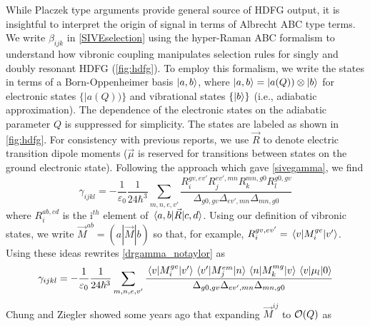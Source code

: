 \documentclass[aip, jcp, reprint, twocolumn]{revtex4-2}
\begin{document}
While Placzek type arguments provide general source of HDFG output, it is insightful to interpret the origin of signal in terms of Albrecht ABC type terms.\cite{Ziegler1988} 
We write $\beta_{ijk}$ in \autoref{SIVEselection} using the hyper-Raman ABC formalism to understand how vibronic coupling manipulates selection rules for singly and doubly resonant HDFG (\autoref{fig:hdfg}). \cite{Ziegler1988, Baranov1990}
To employ this formalism, we write the states in terms of a Born-Oppenheimer basis $\ket{a,b}$, where $\ket{a,b} = |a(Q)) \otimes \ket{b}$ for electronic states $\{|a(Q))\}$ and vibrational states $\{\ket{b}\}$ (i.e., adiabatic approximation). \cite{BornOppenheimer, Tang1970}
The dependence of the electronic states on the adiabatic parameter $Q$ is suppressed for simplicity.
The states are labeled as shown in \autoref{fig:hdfg}.
For consistency with previous reports, we use $\vec{R}$ to denote electric transition dipole moments ($\vec{\mu}$ is reserved for transitions between states on the ground electronic state). \cite{Tang1970}
Following the approach which gave \autoref{sivegamma}, we find
\begin{equation}\label{drgamma_notaylor}
	\gamma_{ijkl} = -\frac{1}{\varepsilon_0} \frac{1}{24 \hbar^3} \sum_{m,n,e,v'} \frac{
		R_{i}^{gv, ev'} 
		R_{j}^{ev',mn} 
		R_{k}^{mn,g0} 
		R_{l}^{g0,gv} 
	}{\Delta_{g0,gv}
		\Delta_{ev', mn}
		\Delta_{mn, g0}
	}
\end{equation}
where $R_{i}^{ab,cd}$ is the i$^{th}$ element of $\mel{a,b}{\vec{R}}{c,d}$.
Using our definition of vibronic states, we write $\vec{M}^{ab} = (a|\vec{M}|b)$ so that, for example,
$R_{i}^{gv,ev'} = \mel{v}{M_i^{ge}}{v'}$.
Using these ideas rewrites \autoref{drgamma_notaylor} as
\begin{equation}\label{drgamma_notaylor_1}
	\begin{split}
		\gamma_{ijkl} &= -\frac{1}{\varepsilon_0} \frac{1}{24 \hbar^3} \sum_{m,n,e,v'} \frac{
			\mel{v}{M_{i}^{ge}}{v'} 
			\mel{v'}{M_{j}^{em}}{n}
			\mel{n}{M_{k}^{mg} }{v}
			\mel{v}{\mu_{l}}{0}
		}{\Delta_{g0,gv}
			\Delta_{ev', mn}
			\Delta_{mn, g0}	} \\
	\end{split}
\end{equation}
Chung and Ziegler showed some years ago that expanding $\vec{M}^{ij}$ to $\order{Q}$ as
\end{document}
